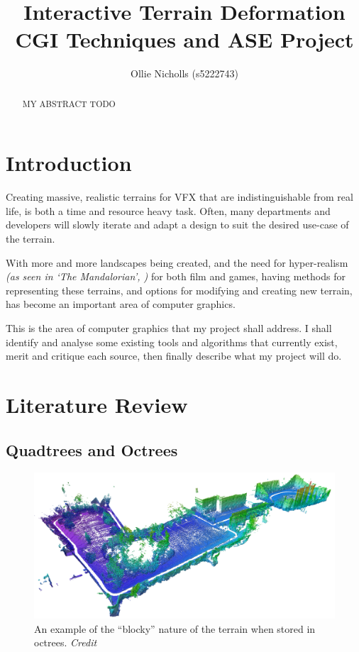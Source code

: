 \documentclass[notitlepage,12pt]{article}
\title{%
Interactive Terrain Deformation \\
\large CGI Techniques and ASE Project}
\author{Ollie Nicholls (s5222743)}
\date{}
\begin{document}
\maketitle

\thispagestyle{empty}

\begin{abstract}
\noindent MY ABSTRACT TODO
\end{abstract}

\newpage
\clearpage
\setcounter{page}{1}

\section{Introduction}

Creating massive, realistic terrains for VFX that are indistinguishable from real life, is both a time and resource heavy task. Often, many departments and developers will slowly iterate and adapt a design to suit the desired use-case of the terrain.

With more and more landscapes being created, and the need for hyper-realism \textit{(as seen in `The Mandalorian', \cite{mandalorian})} for both film and games, having methods for representing these terrains, and options for modifying and creating new terrain, has become an important area of computer graphics.

This is the area of computer graphics that my project shall address. I shall identify and analyse some existing tools and algorithms that currently exist, merit and critique each source, then finally describe what my project will do.

\section{Literature Review}

\subsection{Quadtrees and Octrees}

\begin{figure}[ht]
  \centering
  \includegraphics[width=1.0\textwidth]{octomap.png}
  \caption{An example of the ``blocky'' nature of the terrain when stored in octrees. \textit{Credit \cite{octrees}}}
\end{figure}
\end{document}
